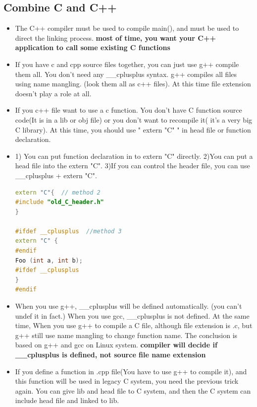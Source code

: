 \documentclass[a4paper,12pt,twoside]{book}
\begin{document}
\subsection{Combine C and C++}
\begin{itemize}
    \item The C++ compiler must be used to compile main(), and must be used to direct the linking process. \textbf{most of time, you want your C++ application to call some existing C functions}
    
    \item If you have c and cpp source files together, you can just use g++ compile them all. You don't need any \_\_cplusplus syntax.  g++ compiles all files using name mangling. (look them all as c++ files). At this time file extension doesn't play a role at all.
    
    \item If you c++ file want to use a c function. You don't have C function source code(It is in a lib or obj file) or you don't want to recompile it( it's a very big C library). At this time, you should use " extern "C" " in head file or function declaration.
    
    \item 1) You can put function declaration in to extern "C" directly. 2)You can put a head file into the extern "C". 3)If you can control the header file, you can use \_\_cplusplus + extern "C".
    
\begin{lstlisting}[frame=single, language=c++]
extern "C"{  // method 2
#include "old_C_header.h"
}

#ifdef __cplusplus  //method 3
extern "C" {
#endif
Foo (int a, int b);
#ifdef __cplusplus
}
#endif
\end{lstlisting}
    
    \item When you use g++,  \_\_cplusplus will be defined automatically. (you can't undef it in fact.) When you use gcc, \_\_cplusplus is not defined. At the same time, When you use g++ to compile a C file, although file extension is .c, but g++ still use name mangling to change function name.  The conclusion is based on g++ and gcc on Linux system. \textbf{compiler will decide if \_\_cplusplus is defined, not source file name extension}
    
    
    \item If you define a function in .cpp file(You have to use g++ to compile it), and this function will be used in legacy C system, you need the previous trick again.  You can give lib and head file to C system,  and then the C system can include head file and linked to lib.
    

\end{itemize}
\end{document}
